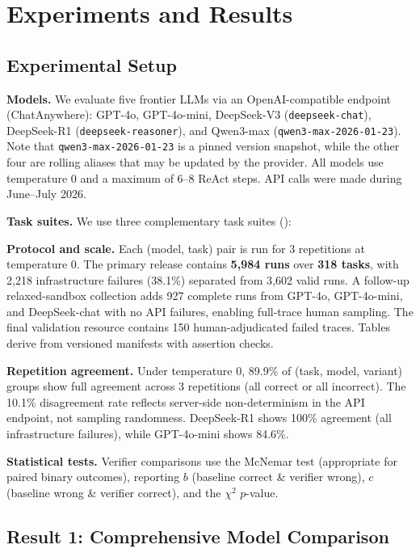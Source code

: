 \section{Experiments and Results}
\label{sec:exp}

\subsection{Experimental Setup}
\label{sec:setup}

\textbf{Models.} We evaluate five frontier LLMs via an OpenAI-compatible endpoint (ChatAnywhere): GPT-4o, GPT-4o-mini, DeepSeek-V3 (\texttt{deepseek-chat}), DeepSeek-R1 (\texttt{deepseek-reasoner}), and Qwen3-max (\texttt{qwen3-max-2026-01-23}). Note that \texttt{qwen3-max-2026-01-23} is a pinned version snapshot, while the other four are rolling aliases that may be updated by the provider. All models use temperature 0 and a maximum of 6--8 ReAct steps. API calls were made during June--July 2026.

\textbf{Task suites.} We use three complementary task suites ():



\textbf{Protocol and scale.} Each (model, task) pair is run for 3 repetitions at temperature 0. The primary release contains \textbf{5{,}984 runs} over \textbf{318 tasks}, with 2{,}218 infrastructure failures (38.1\%) separated from 3{,}602 valid runs. A follow-up relaxed-sandbox collection adds 927 complete runs from GPT-4o, GPT-4o-mini, and DeepSeek-chat with no API failures, enabling full-trace human sampling. The final validation resource contains 150 human-adjudicated failed traces. Tables derive from versioned manifests with assertion checks.

\textbf{Repetition agreement.} Under temperature 0, 89.9\% of (task, model, variant) groups show full agreement across 3 repetitions (all correct or all incorrect). The 10.1\% disagreement rate reflects server-side non-determinism in the API endpoint, not sampling randomness. DeepSeek-R1 shows 100\% agreement (all infrastructure failures), while GPT-4o-mini shows 84.6\%.

\textbf{Statistical tests.} Verifier comparisons use the McNemar test (appropriate for paired binary outcomes), reporting $b$ (baseline correct \& verifier wrong), $c$ (baseline wrong \& verifier correct), and the $\chi^2$ $p$-value.

\subsection{Result 1: Comprehensive Model Comparison}
\label{sec:res-models}

